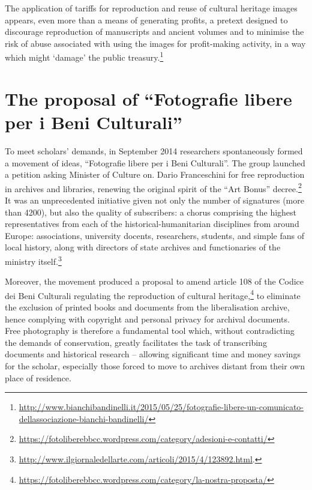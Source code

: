 \documentclass[amsthm,ebook]{saparticle}
\begin{document}
The application of tariffs for reproduction and reuse of cultural heritage images appears, even more than a means of
generating profits, a pretext designed to discourage reproduction of manuscripts and ancient volumes and to minimise
the risk of abuse associated with using the images for profit-making activity, in a way which might `damage' the public
treasury.\footnote{\url{http://www.bianchibandinelli.it/2015/05/25/fotografie-libere-un-comunicato-dellassociazione-bianchi-bandinelli/}}




\section{The proposal of ``Fotografie libere per i Beni Culturali''}




To meet scholars’ demands, in September 2014 researchers spontaneously formed a movement of ideas, ``Fotografie libere
per i Beni Culturali''. The group launched a petition asking Minister of Culture on. Dario Franceschini for free
reproduction in archives and libraries, renewing the original spirit of the ``Art Bonus''
decree.\footnote{\url{https://fotoliberebbcc.wordpress.com/category/adesioni-e-contatti/}} It was an unprecedented
initiative given not only the number of signatures (more than 4200), but also the quality of subscribers: a chorus
comprising the highest representatives from each of the historical-humanitarian disciplines from around Europe:
associations, university docents, researchers, students, and simple fans of local history, along with directors of
state archives and functionaries of the ministry
itself.\footnote{\url{http://www.ilgiornaledellarte.com/articoli/2015/4/123892.html}.}

Moreover, the movement produced a proposal to amend article 108 of the Codice dei Beni Culturali regulating the
reproduction of cultural heritage,\footnote{\url{https://fotoliberebbcc.wordpress.com/category/la-nostra-proposta/}} to eliminate the
exclusion of printed books and documents from the liberalisation archive, hence complying with copyright and personal
privacy for archival documents.
\newpage
Free photography is therefore a fundamental tool which, without contradicting the demands of conservation, greatly
facilitates the task of transcribing documents and historical research – allowing significant time and money savings
for the scholar, especially those forced to move to archives distant from their own place of residence.
\end{document}
